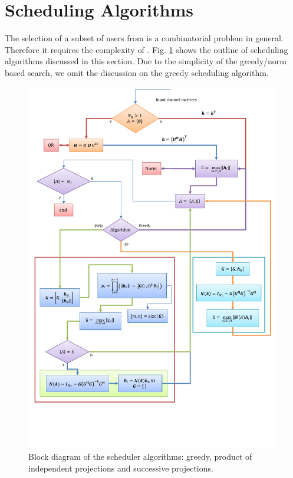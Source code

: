 \documentclass[conference,letterpaper,10pt]{./../../IEEE/IEEEtran}
\begin{document}
\section{Scheduling Algorithms}
\label{sec:sched_discussions}
The selection of a subset of users  from  is a combinatorial problem in general. Therefore it requires the complexity of . Fig. \ref{kuva:scheduler_block_diag} shows the outline of scheduling algorithms discussed in this section. Due to the simplicity of the greedy/norm based search, we omit the discussion on the greedy scheduling algorithm.
\begin{figure}
	\centering
	\includegraphics[trim=0in 1.5in 0in 0.0in,width=\columnwidth, angle=0]{Algorithm_Model}
	\caption{Block diagram of the scheduler algorithms: greedy, product of independent projections and successive projections.}
	\label{kuva:scheduler_block_diag}
	 \vspace{-0.1in}
\end{figure}
\end{document}
